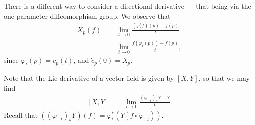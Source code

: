 \documentclass[10pt]{mypackage}
\begin{document}
There is a different way to consider a directional derivative --- that being via the one-parameter diffeomorphism group. We observe that
\begin{align*}
  X_p(f) &= \lim_{t\rightarrow 0} \frac{\left( \varphi_t^{\ast}f \right)(p) - f(p)}{t}\\
         &= \lim_{t\rightarrow 0}\frac{f\left( \varphi_t(p) \right) - f(p)}{t},
\end{align*}
since $\varphi_t(p) = c_p(t)$, and $ \dot{c}_p(0) = X_p $.\newline

Note that the Lie derivative of a vector field is given by $ \left[ X,Y \right] $, so that we may find
\begin{align*}
  \left[ X,Y \right] &= \lim_{t\rightarrow 0} \frac{\left( \varphi_{-t} \right)_{\ast}Y - Y}{t}.
\end{align*}
Recall that $\left( \left( \varphi_{-t} \right)_{\ast}Y \right)(f) = \varphi_t^{\ast}\left( Y\left( f\circ\varphi_{-t} \right) \right)$.\newline
\end{document}

